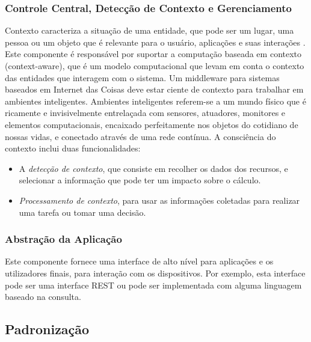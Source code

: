 \subsubsection{Controle Central, Detecção de Contexto e Gerenciamento}

Contexto caracteriza a situação de uma entidade, que pode ser um lugar,
uma pessoa ou um objeto que é relevante para o usuário, aplicações
e suas interações \cite{Bandyopadhyay2011}. Este componente é responsável
por suportar a computação baseada em contexto (context-aware)\cite{schilit1994context},
que é um modelo computacional que levam em conta o contexto das entidades
que interagem com o sistema. Um middleware para sistemas baseados
em Internet das Coisas deve estar ciente de contexto para trabalhar
em ambientes inteligentes\cite{Bandyopadhyay2011}. Ambientes inteligentes
referem-se a um mundo físico que é ricamente e invisivelmente entrelaçada
com sensores, atuadores, monitores e elementos computacionais, encaixado
perfeitamente nos objetos do cotidiano de nossas vidas, e conectado
através de uma rede contínua. A consciência do contexto inclui duas
funcionalidades:
\begin{itemize}
\item A \emph{detecção de contexto}, que consiste em recolher os dados dos
recursos, e selecionar a informação que pode ter um impacto sobre
o cálculo. 
\item \emph{Processamento de contexto}, para usar as informações coletadas
para realizar uma tarefa ou tomar uma decisão.
\end{itemize}

\subsubsection{Abstração da Aplicação}

Este componente fornece uma interface de alto nível para aplicações
e os utilizadores finais, para interação com os dispositivos. Por
exemplo, esta interface pode ser uma interface REST ou pode ser implementada
com alguma linguagem baseado na consulta.

\subsection{Padronização\label{subsec:MiddlewarePadronizacao}}


